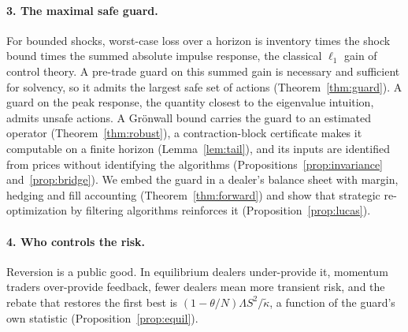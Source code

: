 \documentclass[12pt]{article}
\theoremstyle{definition}
\theoremstyle{remark}
\begin{document}
\paragraph{3. The maximal safe guard.} For bounded shocks, worst-case loss over a horizon is inventory times the shock bound times the summed absolute impulse response, the classical $\ell_1$ gain of control theory. A pre-trade guard on this summed gain is necessary and sufficient for solvency, so it admits the largest safe set of actions (Theorem~\ref{thm:guard}). A guard on the peak response, the quantity closest to the eigenvalue intuition, admits unsafe actions. A Gr\"onwall bound carries the guard to an estimated operator (Theorem~\ref{thm:robust}), a contraction-block certificate makes it computable on a finite horizon (Lemma~\ref{lem:tail}), and its inputs are identified from prices without identifying the algorithms (Propositions~\ref{prop:invariance} and~\ref{prop:bridge}). We embed the guard in a dealer's balance sheet with margin, hedging and fill accounting (Theorem~\ref{thm:forward}) and show that strategic re-optimization by filtering algorithms reinforces it (Proposition~\ref{prop:lucas}).

\paragraph{4. Who controls the risk.} Reversion is a public good. In equilibrium dealers under-provide it, momentum traders over-provide feedback, fewer dealers mean more transient risk, and the rebate that restores the first best is $(1-\theta/N)\Lambda S^2/\tilde\kappa$, a function of the guard's own statistic (Proposition~\ref{prop:equil}).
\end{document}
